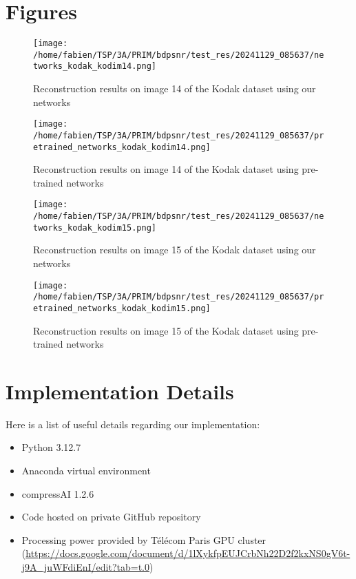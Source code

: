 \appendix

\chapter{Figures}

\begin{figure}
    \centering
    \texttt{[image: /home/fabien/TSP/3A/PRIM/bdpsnr/test\_res/20241129\_085637/networks\_kodak\_kodim14.png]}
    \caption{Reconstruction results on image 14 of the Kodak dataset using our networks}
    \label{bdpsnr_1a_app}
\end{figure}

\begin{figure}
    \centering
    \texttt{[image: /home/fabien/TSP/3A/PRIM/bdpsnr/test\_res/20241129\_085637/pretrained\_networks\_kodak\_kodim14.png]}
    \caption{Reconstruction results on image 14 of the Kodak dataset using pre-trained networks}
    \label{bdpsnr_1b_app}
\end{figure}

\begin{figure}
    \centering
    \texttt{[image: /home/fabien/TSP/3A/PRIM/bdpsnr/test\_res/20241129\_085637/networks\_kodak\_kodim15.png]}
    \caption{Reconstruction results on image 15 of the Kodak dataset using our networks}
    \label{bdpsnr_2a_app}
\end{figure}

\begin{figure}
    \centering
    \texttt{[image: /home/fabien/TSP/3A/PRIM/bdpsnr/test\_res/20241129\_085637/pretrained\_networks\_kodak\_kodim15.png]}
    \caption{Reconstruction results on image 15 of the Kodak dataset using pre-trained networks}
    \label{bdpsnr_2b_app}
\end{figure}

\chapter{Implementation Details}
Here is a list of useful details regarding our implementation:
\begin{itemize}
    \item Python 3.12.7
    \item Anaconda virtual environment
    \item compressAI 1.2.6
    \item Code hosted on private GitHub repository
    \item Processing power provided by Télécom Paris GPU cluster (\url{https://docs.google.com/document/d/1lXykfpEUJCrbNh22D2f2kxNS0gV6t-j9A_juWFdiEnI/edit?tab=t.0})
\end{itemize}